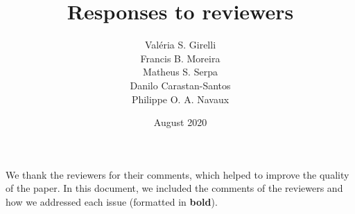 \documentclass{article}
\title{Responses to reviewers}
\author{Valéria S. Girelli\\Francis B. Moreira\\Matheus S. Serpa\\Danilo Carastan-Santos\\Philippe O. A. Navaux}
\date{August 2020}
\begin{document}
\maketitle

We thank the reviewers for their comments, which helped to improve the quality of the paper.
In this document, we included the comments of the reviewers and how we addressed each issue (formatted in \textbf{bold}).





                
            
            
            
            
\end{document}
